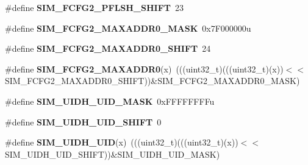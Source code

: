 \begin{DoxyCompactItemize}
\item 
\#define {\bfseries S\+I\+M\+\_\+\+F\+C\+F\+G2\+\_\+\+P\+F\+L\+S\+H\+\_\+\+S\+H\+I\+FT}~23\hypertarget{group__SIM__Register__Masks_ga6ebc783954b7a0846e166efc03ca3a30}{}\label{group__SIM__Register__Masks_ga6ebc783954b7a0846e166efc03ca3a30}

\item 
\#define {\bfseries S\+I\+M\+\_\+\+F\+C\+F\+G2\+\_\+\+M\+A\+X\+A\+D\+D\+R0\+\_\+\+M\+A\+SK}~0x7\+F000000u\hypertarget{group__SIM__Register__Masks_gad1096c0a75d0bf4dfc93f4b1957fe493}{}\label{group__SIM__Register__Masks_gad1096c0a75d0bf4dfc93f4b1957fe493}

\item 
\#define {\bfseries S\+I\+M\+\_\+\+F\+C\+F\+G2\+\_\+\+M\+A\+X\+A\+D\+D\+R0\+\_\+\+S\+H\+I\+FT}~24\hypertarget{group__SIM__Register__Masks_ga3ccb8fde0ef2e170d0c84cdfa3651d34}{}\label{group__SIM__Register__Masks_ga3ccb8fde0ef2e170d0c84cdfa3651d34}

\item 
\#define {\bfseries S\+I\+M\+\_\+\+F\+C\+F\+G2\+\_\+\+M\+A\+X\+A\+D\+D\+R0}(x)~(((uint32\+\_\+t)(((uint32\+\_\+t)(x))$<$$<$S\+I\+M\+\_\+\+F\+C\+F\+G2\+\_\+\+M\+A\+X\+A\+D\+D\+R0\+\_\+\+S\+H\+I\+FT))\&S\+I\+M\+\_\+\+F\+C\+F\+G2\+\_\+\+M\+A\+X\+A\+D\+D\+R0\+\_\+\+M\+A\+SK)\hypertarget{group__SIM__Register__Masks_gae7829e3338a5d460d360b8ed9e06e1e1}{}\label{group__SIM__Register__Masks_gae7829e3338a5d460d360b8ed9e06e1e1}

\item 
\#define {\bfseries S\+I\+M\+\_\+\+U\+I\+D\+H\+\_\+\+U\+I\+D\+\_\+\+M\+A\+SK}~0x\+F\+F\+F\+F\+F\+F\+F\+Fu\hypertarget{group__SIM__Register__Masks_ga313fa2a8e328043458a9ec1e3125c75f}{}\label{group__SIM__Register__Masks_ga313fa2a8e328043458a9ec1e3125c75f}

\item 
\#define {\bfseries S\+I\+M\+\_\+\+U\+I\+D\+H\+\_\+\+U\+I\+D\+\_\+\+S\+H\+I\+FT}~0\hypertarget{group__SIM__Register__Masks_ga2984b4c4d6bb4339997aee03c8a263b1}{}\label{group__SIM__Register__Masks_ga2984b4c4d6bb4339997aee03c8a263b1}

\item 
\#define {\bfseries S\+I\+M\+\_\+\+U\+I\+D\+H\+\_\+\+U\+ID}(x)~(((uint32\+\_\+t)(((uint32\+\_\+t)(x))$<$$<$S\+I\+M\+\_\+\+U\+I\+D\+H\+\_\+\+U\+I\+D\+\_\+\+S\+H\+I\+FT))\&S\+I\+M\+\_\+\+U\+I\+D\+H\+\_\+\+U\+I\+D\+\_\+\+M\+A\+SK)\hypertarget{group__SIM__Register__Masks_gad7d5c35aa9229aeef495aad5e234d799}{}\label{group__SIM__Register__Masks_gad7d5c35aa9229aeef495aad5e234d799}


\end{DoxyCompactItemize}
